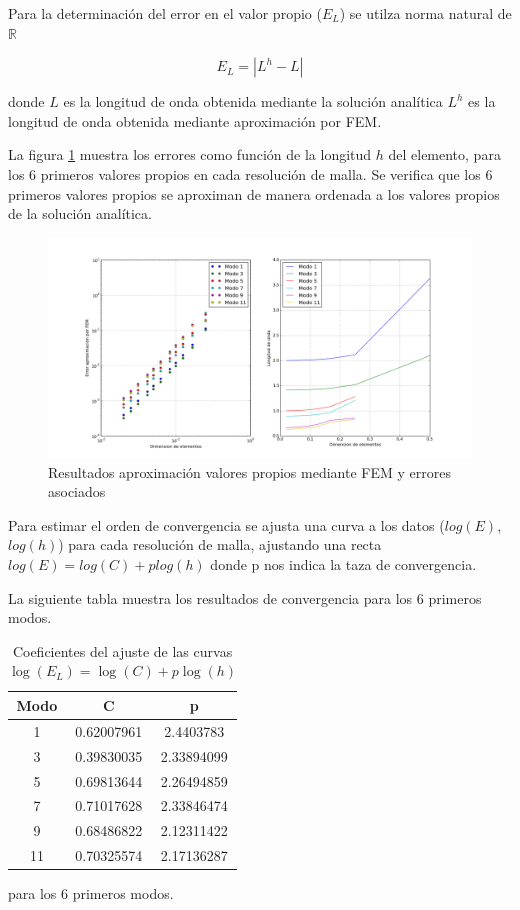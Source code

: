 Para la determinaci\'on del error en el valor propio ($E_L$) se utilza norma natural de $\mathbb{R}$

$$E_L = |L^h - L|$$

donde $L$ es la longitud de onda obtenida mediante la soluci\'on anal\'itica $L^h$ es la longitud de onda obtenida mediante aproximaci\'on por FEM.

La figura \ref{fig:velores_propios} muestra los errores como funci\'on de la longitud $h$ del elemento, para los 6 primeros valores propios en cada resoluci\'on de malla. Se verifica que los 6 primeros valores propios se aproximan de manera ordenada a los valores propios de la soluci\'on anal\'itica.

\begin{figure}
  \centering
  \includegraphics[width=17cm]{figuras/valores_propiosFEM.png}
  \caption{ Resultados aproximaci\'on valores propios mediante FEM y errores asociados}  
  \label{fig:velores_propios}
\end{figure}

Para estimar el orden de convergencia se ajusta una curva a los datos ($log(E)$, $log(h)$) para cada resoluci\'on de malla, ajustando una recta $log(E) = log(C) + p log(h)$ donde p nos indica la taza de convergencia.

La siguiente tabla muestra los resultados de convergencia para los 6 primeros modos.

\begin{table}[h]
\centering
\begin{tabular}{|c|c|c|}
\hline 
Modo & C & p \\ 
\hline 
1 & 0.62007961 & 2.4403783 \\
\hline 
3 & 0.39830035 & 2.33894099 \\ 
\hline 
5 & 0.69813644 & 2.26494859 \\  
\hline 
7 & 0.71017628 & 2.33846474 \\ 
\hline 
9 & 0.68486822 & 2.12311422 \\  
\hline 
11 &  0.70325574 & 2.17136287 \\
\hline 
\end{tabular} 
\caption{Coeficientes del ajuste de las curvas $\log(E_L)=\log(C)+p\log(h)$} para los 6 primeros modos.
\end{table}

